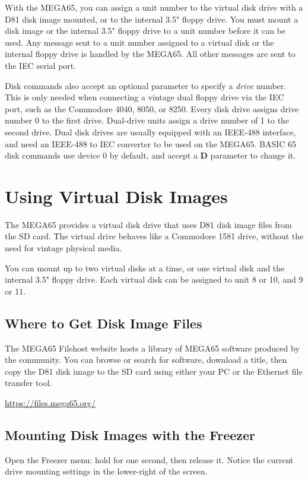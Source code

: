 With the MEGA65, you can assign a unit number to the virtual disk drive with a D81 disk image mounted, or to the internal 3.5" floppy drive. You must mount a disk image or the internal 3.5" floppy drive to a unit number before it can be used. Any message sent to a unit number assigned to a virtual disk or the internal floppy drive is handled by the MEGA65. All other messages are sent to the IEC serial port.

Disk commands also accept an optional parameter to specify a {\it drive} number. This is only needed when connecting a vintage dual floppy drive via the IEC port, such as the Commodore 4040, 8050, or 8250. Every disk drive assigns drive number 0 to the first drive. Dual-drive units assign a drive number of 1 to the second drive. Dual disk drives are usually equipped with an IEEE-488 interface, and need an IEEE-488 to IEC converter to be used on the MEGA65. BASIC 65 disk commands use device 0 by default, and accept a {\bf D} parameter to change it.


\section{Using Virtual Disk Images}

The MEGA65 provides a virtual disk drive that uses D81 disk image files from the SD card. The virtual drive behaves like a Commodore 1581 drive, without the need for vintage physical media.

You can mount up to two virtual disks at a time, or one virtual disk and the internal 3.5" floppy drive. Each virtual disk can be assigned to unit 8 or 10, and 9 or 11.

\subsection{Where to Get Disk Image Files}

The MEGA65 Filehost website hosts a library of MEGA65 software produced by the community. You can browse or search for software, download a title, then copy the D81 disk image to the SD card using either your PC or the Ethernet file transfer tool.

\url{https://files.mega65.org/}

\subsection{Mounting Disk Images with the Freezer}

Open the Freezer menu: hold  for one second, then release it. Notice the current drive mounting settings in the lower-right of the screen.

